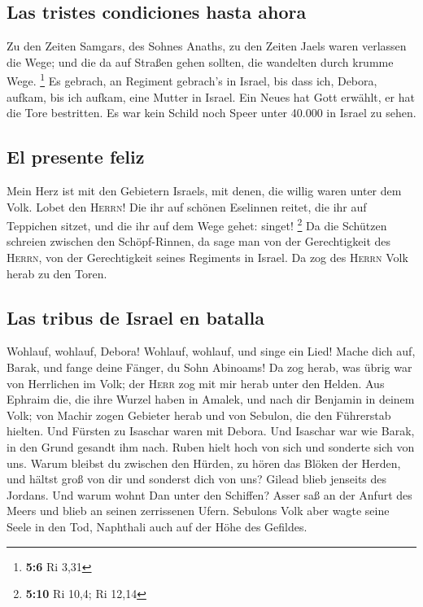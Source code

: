 \hypertarget{las-tristes-condiciones-hasta-ahora}{%
\subsection{Las tristes condiciones hasta
ahora}\label{las-tristes-condiciones-hasta-ahora}}

 Zu den Zeiten Samgars, des Sohnes Anaths, zu den Zeiten
Jaels waren verlassen die Wege; und die da auf Straßen gehen sollten,
die wandelten durch krumme Wege. \footnote{\textbf{5:6} Ri 3,31}
 Es gebrach, an Regiment gebrach's in Israel, bis dass
ich, Debora, aufkam, bis ich aufkam, eine Mutter in Israel.
 Ein Neues hat Gott erwählt, er hat die Tore bestritten.
Es war kein Schild noch Speer unter 40.000 in Israel zu sehen.

\hypertarget{el-presente-feliz}{%
\subsection{El presente feliz}\label{el-presente-feliz}}

 Mein Herz ist mit den Gebietern Israels, mit denen, die
willig waren unter dem Volk. Lobet den \textsc{Herrn}! 
Die ihr auf schönen Eselinnen reitet, die ihr auf Teppichen sitzet, und
die ihr auf dem Wege gehet: singet! \footnote{\textbf{5:10} Ri 10,4; Ri
  12,14}  Da die Schützen schreien zwischen den
Schöpf-Rinnen, da sage man von der Gerechtigkeit des \textsc{Herrn}, von
der Gerechtigkeit seines Regiments in Israel. Da zog des \textsc{Herrn}
Volk herab zu den Toren.

\hypertarget{las-tribus-de-israel-en-batalla}{%
\subsection{Las tribus de Israel en
batalla}\label{las-tribus-de-israel-en-batalla}}

 Wohlauf, wohlauf, Debora! Wohlauf, wohlauf, und singe
ein Lied! Mache dich auf, Barak, und fange deine Fänger, du Sohn
Abinoams!  Da zog herab, was übrig war von Herrlichen im
Volk; der \textsc{Herr} zog mit mir herab unter den Helden.
 Aus Ephraim die, die ihre Wurzel haben in Amalek, und
nach dir Benjamin in deinem Volk; von Machir zogen Gebieter herab und
von Sebulon, die den Führerstab hielten.  Und Fürsten zu
Isaschar waren mit Debora. Und Isaschar war wie Barak, in den Grund
gesandt ihm nach. Ruben hielt hoch von sich und sonderte sich von uns.
 Warum bleibst du zwischen den Hürden, zu hören das
Blöken der Herden, und hältst groß von dir und sonderst dich von uns?
 Gilead blieb jenseits des Jordans. Und warum wohnt Dan
unter den Schiffen? Asser saß an der Anfurt des Meers und blieb an
seinen zerrissenen Ufern.  Sebulons Volk aber wagte seine
Seele in den Tod, Naphthali auch auf der Höhe des Gefildes.

